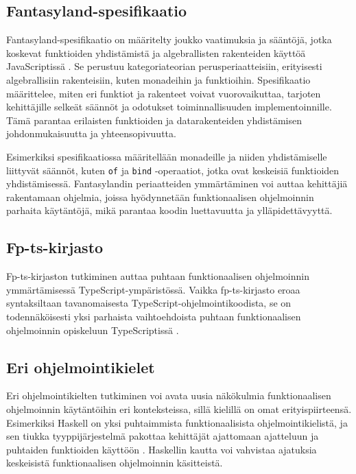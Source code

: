 \subsection{Fantasyland-spesifikaatio}

Fantasyland-spesifikaatio on määritelty joukko vaatimuksia ja sääntöjä, jotka koskevat funktioiden yhdistämistä ja algebrallisten rakenteiden käyttöä JavaScriptissä \cite{fantasy-land:contributors}. Se perustuu kategoriateorian perusperiaatteisiin, erityisesti algebrallisiin rakenteisiin, kuten monadeihin ja funktioihin. Spesifikaatio määrittelee, miten eri funktiot ja rakenteet voivat vuorovaikuttaa, tarjoten kehittäjille selkeät säännöt ja odotukset toiminnallisuuden implementoinnille. Tämä parantaa erilaisten funktioiden ja datarakenteiden yhdistämisen johdonmukaisuutta ja yhteensopivuutta.

Esimerkiksi spesifikaatiossa määritellään monadeille ja niiden yhdistämiselle liittyvät säännöt, kuten \texttt{of} ja \texttt{bind} -operaatiot, jotka ovat keskeisiä funktioiden yhdistämisessä. Fantasylandin periaatteiden ymmärtäminen voi auttaa kehittäjiä rakentamaan ohjelmia, joissa hyödynnetään funktionaalisen ohjelmoinnin parhaita käytäntöjä, mikä parantaa koodin luettavuutta ja ylläpidettävyyttä.

\subsection{Fp-ts-kirjasto}

Fp-ts-kirjaston tutkiminen auttaa puhtaan funktionaalisen ohjelmoinnin ymmärtämisessä TypeScript-ympäristössä. Vaikka fp-ts-kirjasto eroaa syntaksiltaan tavanomaisesta TypeScript-ohjelmointikoodista, se on todennäköisesti yksi parhaista vaihtoehdoista puhtaan funktionaalisen ohjelmoinnin opiskeluun TypeScriptissä \cite{holvikari2021category}.

\subsection{Eri ohjelmointikielet}

Eri ohjelmointikielten tutkiminen voi avata uusia näkökulmia funktionaalisen ohjelmoinnin käytäntöihin eri konteksteissa, sillä kielillä on omat erityispiirteensä. Esimerkiksi Haskell on yksi puhtaimmista funktionaalisista ohjelmointikielistä, ja sen tiukka tyyppijärjestelmä pakottaa kehittäjät ajattomaan ajatteluun ja puhtaiden funktioiden käyttöön \cite{haskellallmonad,haskellcomposition,haskellmonadlaws}. Haskellin kautta voi vahvistaa ajatuksia keskeisistä funktionaalisen ohjelmoinnin käsitteistä.

